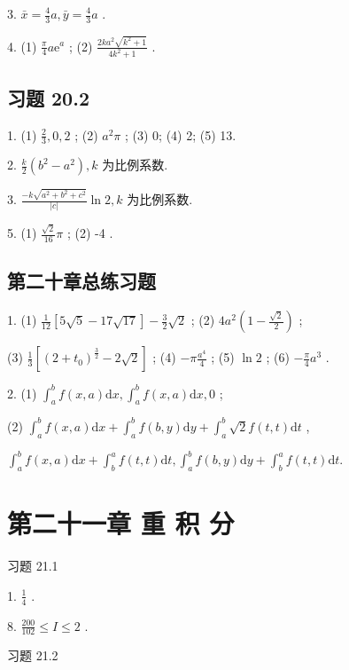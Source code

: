 3. \(\bar{x} = \frac{4}{3}a,\bar{y} = \frac{4}{3}a\) .

4. (1) \(\frac{\pi }{4}a{\mathrm{e}}^{a}\) ; (2) \(\frac{{2k}{a}^{2}\sqrt{{k}^{2} + 1}}{4{k}^{2} + 1}\) .

\subsection{习题 20.2}

1. (1) \(\frac{2}{3},0,2\) ; (2) \({a}^{2}\pi\) ; (3) 0; (4) 2; (5) 13.

2. \(\frac{k}{2}\left( {{b}^{2} - {a}^{2}}\right) ,k\) 为比例系数.

3. \(\frac{-k\sqrt{{a}^{2} + {b}^{2} + {c}^{2}}}{\left| c\right| }\ln 2,k\) 为比例系数.

5. (1) \(\frac{\sqrt{2}}{16}\pi\) ; (2) -4 .

\subsection{第二十章总练习题}

1. (1) \(\frac{1}{12}\left\lbrack  {5\sqrt{5} - {17}\sqrt{17}}\right\rbrack   - \frac{3}{2}\sqrt{2}\) ; (2) \(4{a}^{2}\left( {1 - \frac{\sqrt{2}}{2}}\right)\) ;

(3) \(\frac{1}{3}\left\lbrack  {{\left( 2 + {t}_{0}\right) }^{\frac{3}{2}} - 2\sqrt{2}}\right\rbrack\) ; (4) \(- \pi \frac{{a}^{4}}{4}\) ; (5) \(\ln 2\) ; (6) \(- \frac{\pi }{4}{a}^{3}\) .

2. (1) \({\int }_{a}^{b}f\left( {x,a}\right) \mathrm{d}x,{\int }_{a}^{b}f\left( {x,a}\right) \mathrm{d}x,0\) ;

(2) \({\int }_{a}^{b}f\left( {x,a}\right) \mathrm{d}x + {\int }_{a}^{b}f\left( {b,y}\right) \mathrm{d}y + {\int }_{a}^{b}\sqrt{2}f\left( {t,t}\right) \mathrm{d}t\) ,

\({\int }_{a}^{b}f\left( {x,a}\right) \mathrm{d}x + {\int }_{b}^{a}f\left( {t,t}\right) \mathrm{d}t,{\int }_{a}^{b}f\left( {b,y}\right) \mathrm{d}y + {\int }_{b}^{a}f\left( {t,t}\right) \mathrm{d}t.\)

\section{第二十一章 重 积 分}

习题 21.1

1. \(\frac{1}{4}\) .

8. \(\frac{200}{102} \leq  I \leq  2\) .

习题 21.2

